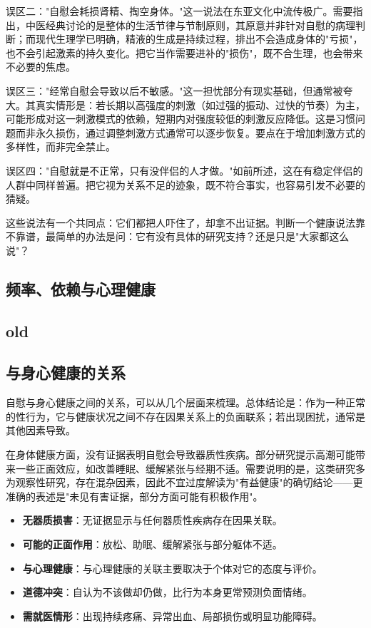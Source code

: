 \documentclass[12pt,UTF8]{ctexbook}
\newcommand{\keyword}[1]{\textbf{#1}}
\begin{document}
误区二："自慰会耗损肾精、掏空身体。"这一说法在东亚文化中流传极广。需要指出，中医经典讨论的是整体的生活节律与节制原则，其原意并非针对自慰的病理判断；而现代生理学已明确，精液的生成是持续过程，排出不会造成身体的"亏损"，也不会引起激素的持久变化。把它当作需要进补的"损伤"，既不合生理，也会带来不必要的焦虑。

误区三："经常自慰会导致以后不敏感。"这一担忧部分有现实基础，但通常被夸大。其真实情形是：若长期以高强度的刺激（如过强的振动、过快的节奏）为主，可能形成对这一刺激模式的依赖，短期内对强度较低的刺激反应降低。这是习惯问题而非永久损伤，通过调整刺激方式通常可以逐步恢复。要点在于增加刺激方式的多样性，而非完全禁止。

误区四："自慰就是不正常，只有没伴侣的人才做。"如前所述，这在有稳定伴侣的人群中同样普遍。把它视为关系不足的迹象，既不符合事实，也容易引发不必要的猜疑。

\begin{tcolorbox}[colback=pink!5!white,colframe=red!50!black,title=贴心小叮咛]
	这些说法有一个共同点：它们都把人吓住了，却拿不出证据。判断一个健康说法靠不靠谱，最简单的办法是问：它有没有具体的研究支持？还是只是"大家都这么说"？
\end{tcolorbox}

\subsection{频率、依赖与心理健康}

\subsection{old}

\subsection{与身心健康的关系}

自慰与身心健康之间的关系，可以从几个层面来梳理。总体结论是：作为一种正常的性行为，它与健康状况之间不存在因果关系上的负面联系；若出现困扰，通常是其他因素导致。

在身体健康方面，没有证据表明自慰会导致器质性疾病。部分研究提示高潮可能带来一些正面效应，如改善睡眠、缓解紧张与经期不适。需要说明的是，这类研究多为观察性研究，存在混杂因素，因此不宜过度解读为"有益健康"的确切结论——更准确的表述是"未见有害证据，部分方面可能有积极作用"。

\begin{itemize}
	\item \keyword{无器质损害}：无证据显示与任何器质性疾病存在因果关联。
	\item \keyword{可能的正面作用}：放松、助眠、缓解紧张与部分躯体不适。
	\item \keyword{与心理健康}：与心理健康的关联主要取决于个体对它的态度与评价。
	\item \keyword{道德冲突}：自认为不该做却仍做，比行为本身更常预测负面情绪。
	\item \keyword{需就医情形}：出现持续疼痛、异常出血、局部损伤或明显功能障碍。
\end{itemize}
\end{document}
